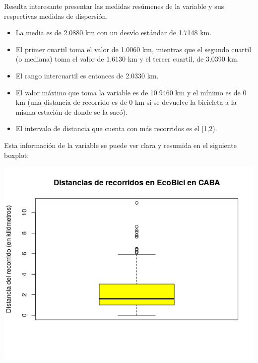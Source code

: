 \documentclass[11pt]{article}
\begin{document}
      Resulta interesante presentar las medidas res\'umenes de la variable y sus respectivas medidas de dispersi\'on.

      \begin{itemize}
        \item La media es de 2.0880 km con un desv\'io est\'andar de 1.7148 km.
        \item El primer cuartil toma el valor de 1.0060 km, mientras que el segundo cuartil (o mediana)
        toma el valor de 1.6130 km y el tercer cuartil, de 3.0390 km.
        \item El rango intercuartil es entonces de 2.0330 km. 
        \item El valor m\'aximo que toma la variable es de 10.9460 km y el m\'inimo es de 0 km (una distancia de recorrido es de 0 km si se devuelve la bicicleta a la misma estaci\'on de donde se la sac\'o).
        \item El intervalo de distancia que cuenta con m\'as recorridos es el [1,2).
      \end{itemize}

      Esta informaci\'on de la variable se puede ver clara y resumida en el siguiente boxplot: 

      \begin{center}
        \includegraphics[scale=0.7]{BoxPlotDist.png}
      \end{center}

      \vspace{-1.5cm}
\end{document}
